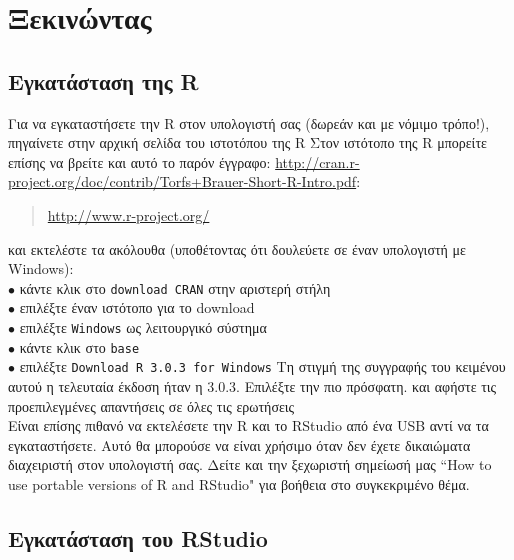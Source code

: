 \documentclass[a4paper,10pt,twocolumn]{article}
\makeatletter
\let\SF@@footnote\footnote
\def\footnote{\ifx\protect\@typeset@protect
 \expandafter\SF@@footnote
 \else
 \expandafter\SF@gobble@opt
 \fi
}
\edef\SF@gobble@opt{\noexpand\protect
 \expandafter\noexpand\csname SF@gobble@opt \endcsname}
\makeatother
\begin{document}
\section{Ξεκινώντας}

\subsection{Εγκατάσταση της R}

Για να εγκαταστήσετε την R στον υπολογιστή σας (δωρεάν και με νόμιμο τρόπο!), πηγαίνετε στην
αρχική σελίδα του ιστοτόπου της R\footnote{Στον ιστότοπο της R μπορείτε επίσης να βρείτε και
αυτό το παρόν έγγραφο: \url{http://cran.r-project.org/doc/contrib/Torfs+Brauer-Short-R-Intro.pdf}}:
\begin{quote}
  \url{http://www.r-project.org/}
\end{quote}
και εκτελέστε τα ακόλουθα (υποθέτοντας ότι δουλεύετε σε έναν υπολογιστή με Windows):\\
\noindent $\bullet$ κάντε κλικ στο \texttt{download CRAN} στην αριστερή στήλη\\
\noindent $\bullet$ επιλέξτε έναν ιστότοπο  για το download\\
\noindent $\bullet$ επιλέξτε \texttt{Windows} ως λειτουργικό σύστημα\\
\noindent $\bullet$ κάντε κλικ στο \texttt{base}\\
\noindent $\bullet$ επιλέξτε \texttt{Download R 3.0.3 for Windows} \footnote{Τη στιγμή της
συγγραφής του κειμένου αυτού η τελευταία έκδοση ήταν η 3.0.3. Επιλέξτε την πιο πρόσφατη.} και
αφήστε τις προεπιλεγμένες απαντήσεις σε όλες τις ερωτήσεις\\

Είναι επίσης πιθανό να εκτελέσετε την R και το RStudio από ένα USB αντί να τα εγκαταστήσετε. Αυτό
θα μπορούσε να είναι χρήσιμο όταν δεν έχετε δικαιώματα διαχειριστή στον υπολογιστή σας. Δείτε και 
την ξεχωριστή σημείωσή μας ``How to use portable versions of R and RStudio" για βοήθεια στο 
συγκεκριμένο θέμα.

\subsection{Εγκατάσταση του RStudio}
\end{document}
